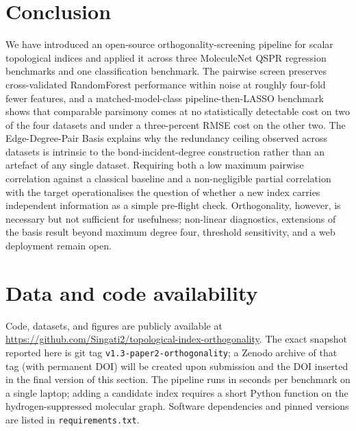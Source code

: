 \documentclass[STIX1COL]{WileyNJDv5}
\theoremstyle{definition}
\begin{document}
\section{Conclusion}

We have introduced an open-source orthogonality-screening pipeline
for scalar topological indices and applied it across three
MoleculeNet QSPR regression benchmarks and one classification
benchmark. The pairwise screen preserves cross-validated
RandomForest performance within noise at roughly four-fold fewer
features, and a matched-model-class pipeline-then-LASSO benchmark
shows that comparable parsimony comes at no statistically
detectable cost on two of the four datasets and under a
three-percent RMSE cost on the other two. The Edge-Degree-Pair
Basis explains why the redundancy ceiling observed across datasets
is intrinsic to the bond-incident-degree construction rather than
an artefact of any single dataset. Requiring both a low maximum
pairwise correlation against a classical baseline and a
non-negligible partial correlation with the target operationalises
the question of whether a new index carries independent
information as a simple pre-flight check. Orthogonality, however,
is necessary but not sufficient for usefulness; non-linear
diagnostics, extensions of the basis result beyond maximum degree
four, threshold sensitivity, and a web deployment remain open.

\section*{Data and code availability}

Code, datasets, and figures are publicly available at
\url{https://github.com/Singati2/topological-index-orthogonality}.
The exact snapshot reported here is git tag
\texttt{v1.3-paper2-orthogonality}; a Zenodo archive of that tag
(with permanent DOI) will be created upon submission and the DOI
inserted in the final version of this section. The pipeline runs
in seconds per benchmark on a single laptop; adding a candidate
index requires a short Python function on the
hydrogen-suppressed molecular graph. Software dependencies and
pinned versions are listed in
\texttt{requirements.txt}.
\end{document}
